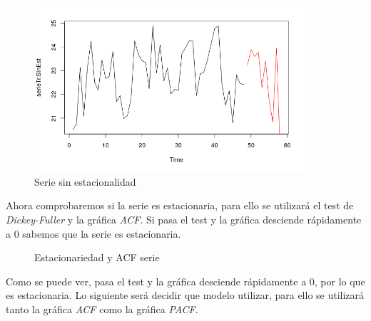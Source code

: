 \begin{figure}[H]
	\centering
	\includegraphics[width=100mm]{imagenes/sin_est_mean.png}
	\caption{Serie sin estacionalidad}
	\label{fig:19}
\end{figure}


Ahora comprobaremos si la serie es estacionaria, para ello se utilizará el test de \textit{Dickey-Fuller} y la gráfica \textit{ACF}. Si pasa el test y la gráfica desciende rápidamente a 0 sabemos que la serie es estacionaria.

\begin{figure}[H]
	\centering
	\caption{Estacionariedad y ACF serie}
	\label{fig:20}
\end{figure}

Como se puede ver, pasa el test y la gráfica desciende rápidamente a 0, por lo que es estacionaria. Lo siguiente será decidir que modelo utilizar, para ello se utilizará tanto la gráfica \textit{ACF} como la gráfica \textit{PACF}.

